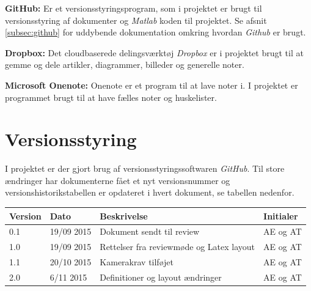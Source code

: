 \textbf{GitHub:} Er et versionsstyringsprogram, som i projektet er brugt til versionsstyring af dokumenter og \textit{Matlab} koden til projektet. Se afsnit \ref{subsec:github} for uddybende dokumentation omkring hvordan \textit{Github} er brugt.

\textbf{Dropbox:} Det cloudbaserede delingsværktøj \textit{Dropbox} er i projektet brugt til at gemme og dele artikler, diagrammer, billeder og generelle noter.

\textbf{Microsoft Onenote:} Onenote er et program til at lave noter i. I projektet er programmet brugt til at have fælles noter og huskelister.


\newpage
\section{Versionsstyring}
I projektet er der gjort brug af versionsstyringssoftwaren \textit{GitHub}. Til store ændringer har dokumenterne fået et nyt versionsnummer og versionshistorikstabellen er opdateret i hvert dokument, se tabellen nedenfor. 

\begin{center}
		\begin{longtable}{ | m{1.5cm} | m{2cm}| m{7cm}| m{2cm}| } 
			\hline
			\textbf{Version}  & \textbf{Dato} & \textbf{Beskrivelse} & \textbf{Initialer}  \\ 
			\hline
			0.1  &  19/09 2015  & Dokument sendt til review & AE og AT \\
			\hline
		1.0  &  19/09 2015  & Rettelser fra reviewmøde og Latex layout & AE og AT \\
		\hline
		1.1  &  20/10 2015  & Kamerakrav tilføjet & AE og AT \\
		\hline
		2.0  &  6/11 2015  & Definitioner og layout ændringer & AE og AT \\
			\hline
		\end{longtable}
		
	\end{center}


